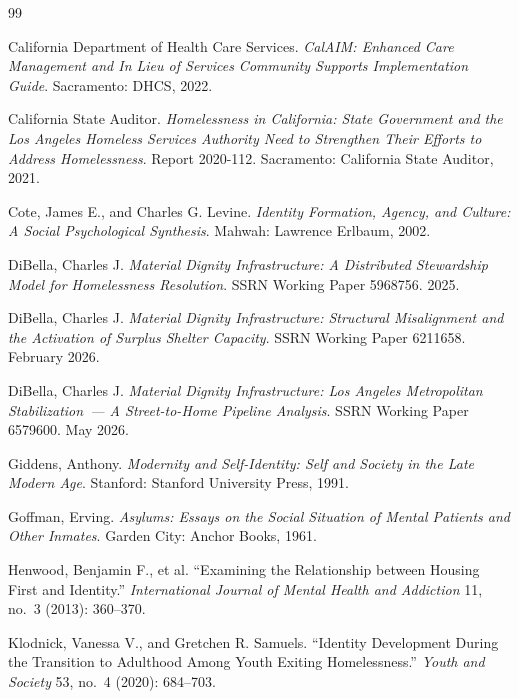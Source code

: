 \documentclass[12pt, letterpaper]{article}
\begin{document}
\newpage
{}

\begin{thebibliography}{99}

California Department of Health Care Services. \textit{CalAIM: Enhanced Care Management and In Lieu of Services Community Supports Implementation Guide}. Sacramento: DHCS, 2022.

California State Auditor. \textit{Homelessness in California: State Government and the Los Angeles Homeless Services Authority Need to Strengthen Their Efforts to Address Homelessness}. Report 2020-112. Sacramento: California State Auditor, 2021.

Cote, James E., and Charles G. Levine. \textit{Identity Formation, Agency, and Culture: A Social Psychological Synthesis}. Mahwah: Lawrence Erlbaum, 2002.

DiBella, Charles J. \textit{Material Dignity Infrastructure: A Distributed Stewardship Model for Homelessness Resolution}. SSRN Working Paper 5968756. 2025.

DiBella, Charles J. \textit{Material Dignity Infrastructure: Structural Misalignment and the Activation of Surplus Shelter Capacity}. SSRN Working Paper 6211658. February 2026.

DiBella, Charles J. \textit{Material Dignity Infrastructure: Los Angeles Metropolitan Stabilization~--- A Street-to-Home Pipeline Analysis}. SSRN Working Paper 6579600. May 2026.

Giddens, Anthony. \textit{Modernity and Self-Identity: Self and Society in the Late Modern Age}. Stanford: Stanford University Press, 1991.

Goffman, Erving. \textit{Asylums: Essays on the Social Situation of Mental Patients and Other Inmates}. Garden City: Anchor Books, 1961.

Henwood, Benjamin F., et al. ``Examining the Relationship between Housing First and Identity.'' \textit{International Journal of Mental Health and Addiction} 11, no.\ 3 (2013): 360--370.

Klodnick, Vanessa V., and Gretchen R. Samuels. ``Identity Development During the Transition to Adulthood Among Youth Exiting Homelessness.'' \textit{Youth and Society} 53, no.\ 4 (2020): 684--703.


\end{thebibliography}
\end{document}
